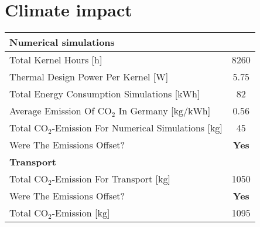 \section*{Climate impact}


\begin{center}
\begin{tabular}[b]{l c}
\hline
\textbf{Numerical simulations} & \\
\hline
Total Kernel Hours [$\mathrm{h}$]& 8260\\
Thermal Design Power Per Kernel [$\mathrm{W}$]& 5.75\\
Total Energy Consumption Simulations [$\mathrm{kWh}$] & 82\\
Average Emission Of CO$_2$ In Germany [$\mathrm{kg/kWh}$]& 0.56\\
Total CO$_2$-Emission For Numerical Simulations [$\mathrm{kg}$] & 45\\
Were The Emissions Offset? & \textbf{Yes}\\
\hline
\textbf{Transport} & \\
\hline
Total CO$_2$-Emission For Transport [$\mathrm{kg}$] & 1050\\
Were The Emissions Offset? & \textbf{Yes}\\
\hline
Total CO$_2$-Emission [$\mathrm{kg}$] & 1095\\
\hline
\hline
\end{tabular}
\end{center}